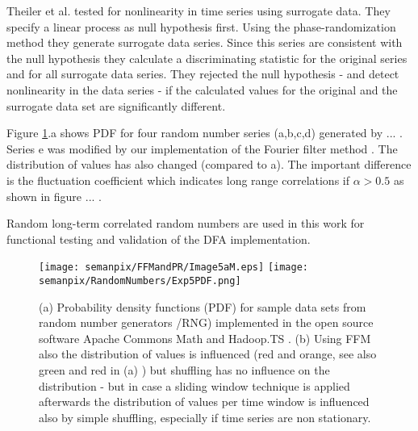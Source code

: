 \documentclass[a4paper,10pt]{scrbook}
\begin{document}
Theiler et al. \cite{Teiler1992} tested for nonlinearity in time series using surrogate data. They specify a linear process as null hypothesis first. 
Using the phase-randomization method they generate surrogate data series. Since this series are consistent with the null hypothesis
they calculate a discriminating statistic for the original series and for all surrogate data series. They rejected the null hypothesis - and detect nonlinearity in the data series - if the calculated values for the original and the surrogate data set are significantly different.

Figure \ref{fig:rand_num_dists}.a shows PDF for four random number series (a,b,c,d) generated by ... \cite{ACM3}. Series e was modified by our implementation of the Fourier filter method \cite{Hadoop.TS}. The distribution of values has also changed (compared to a). The important difference is the fluctuation coefficient which indicates long range correlations if $\alpha > 0.5$ as shown in figure ... . 

Random long-term correlated random numbers are used in this work for functional testing and validation of the DFA implementation. 

%
%
%
\begin{figure}[htp]
 \centering
 \centering
\texttt{[image: semanpix/FFMandPR/Image5aM.eps]}
\texttt{[image: semanpix/RandomNumbers/Exp5PDF.png]}
\caption{(a) Probability density functions (PDF) for sample data sets from random number generators /RNG) implemented in the open source software Apache Commons Math \cite{ACM3} and Hadoop.TS \cite{Hadoop.TS}. (b) Using FFM also the distribution of values is influenced (red and orange, see also green and red in (a) ) but shuffling has no influence on the distribution - but in case a sliding window technique is applied afterwards the distribution of values per time window is influenced also by simple shuffling, especially if time series are non stationary.} 
 \label{fig:rand_num_dists}
\end{figure}


\end{document}
